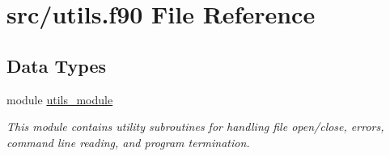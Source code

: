 \hypertarget{utils_8f90}{\section{src/utils.f90 File Reference}
\label{utils_8f90}
}
\subsection*{Data Types}
\begin{DoxyCompactItemize}
\item 
module \hyperlink{classutils__module}{utils\-\_\-module}
\begin{DoxyCompactList}\small\item\em This module contains utility subroutines for handling file open/close, errors, command line reading, and program termination. \end{DoxyCompactList}\end{DoxyCompactItemize}
